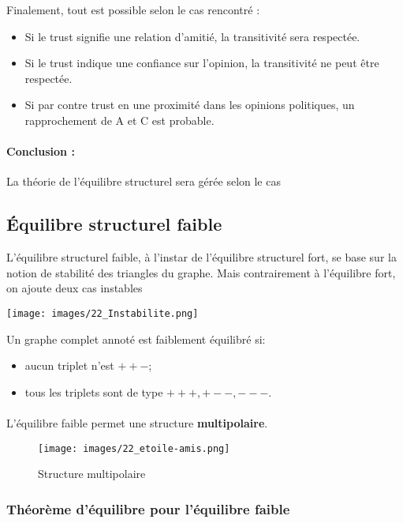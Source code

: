Finalement, tout est possible selon le cas rencontré : 
\begin{itemize}
\item Si le trust signifie une relation d'amitié, la transitivité sera respectée. 
\item Si le trust indique une confiance sur l’opinion, la transitivité ne peut être respectée. 
\item Si par contre trust en une proximité dans les opinions politiques, un rapprochement de A et C est probable. 
\end{itemize}


\paragraph{Conclusion :}La théorie de l'équilibre structurel sera gérée selon le cas




\subsection{Équilibre structurel faible}
L'équilibre structurel faible, à l'instar de l'équilibre structurel fort, se base sur la
notion de stabilité des triangles du graphe. Mais contrairement à l'équilibre fort, on ajoute deux cas instables   

\texttt{[image: images/22\_Instabilite.png]}

Un graphe complet annoté est faiblement équilibré si:
\begin{itemize}
\item aucun triplet n'est $++-$;
\item tous les triplets sont de type $+++, +--, ---$. 
\end{itemize}
\paragraph{}
L'équilibre faible permet une structure \textbf{multipolaire}.

\begin{figure}[h!]
\label{fig:multipolaire}
\caption{Structure multipolaire}
\centering
\texttt{[image: images/22\_etoile-amis.png]}
\end{figure}



\subsubsection*{Théorème d'équilibre pour l'équilibre faible}

